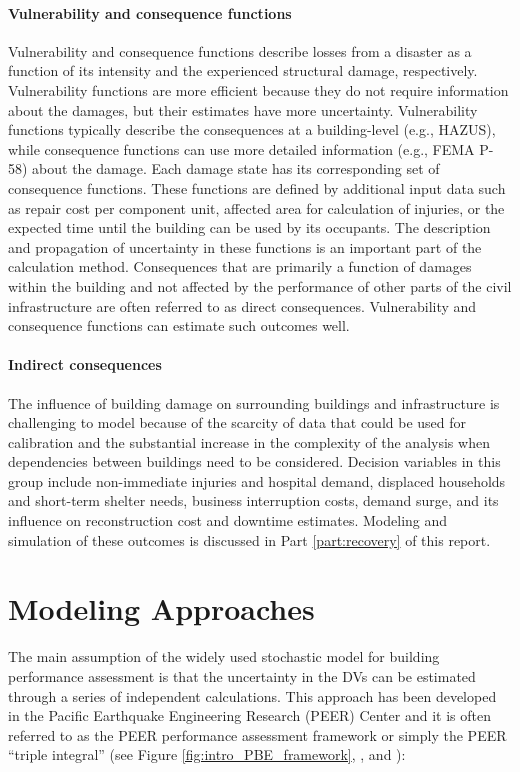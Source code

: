 \paragraph{Vulnerability and consequence functions} Vulnerability and consequence functions describe losses from a disaster as a function of its intensity and the experienced structural damage, respectively. Vulnerability functions are more efficient because they do not require information about the damages, but their estimates have more uncertainty. Vulnerability functions typically describe the consequences at a building-level (e.g., HAZUS), while consequence functions can use more detailed information (e.g., FEMA P-58) about the damage. Each damage state has its corresponding set of consequence functions. These functions are defined by additional input data such as repair cost per component unit, affected area for calculation of injuries, or the expected time until the building can be used by its occupants. The description and propagation of uncertainty in these functions is an important part of the calculation method. Consequences that are primarily a function of damages within the building and not affected by the performance of other parts of the civil infrastructure are often referred to as direct consequences. Vulnerability and consequence functions can estimate such outcomes well.

\paragraph{Indirect consequences} The influence of building damage on surrounding buildings and infrastructure is challenging to model because of the scarcity of data that could be used for calibration and the substantial increase in the complexity of the analysis when dependencies between buildings need to be considered. Decision variables in this group include non-immediate injuries and hospital demand, displaced households and short-term shelter needs, business interruption costs, demand surge, and its influence on reconstruction cost and downtime estimates. Modeling and simulation of these  outcomes is discussed in Part \ref{part:recovery} of this report.

\section{Modeling Approaches}
\label{sec:perf_bldg_methods}

The main assumption of the widely used stochastic model for building performance assessment is that the uncertainty in the DVs can be estimated through a series of independent calculations. This approach has been developed in the Pacific Earthquake Engineering Research (PEER) Center and it is often referred to as the PEER performance assessment framework or simply the PEER ``triple integral'' (see Figure \ref{fig:intro_PBE_framework}, \cite{moehle2004framework}, and \cite{porter2001assemblybased}):

